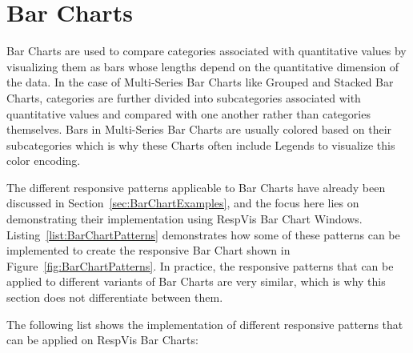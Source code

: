 \section{Bar Charts}
\label{sec:BarChartsUsage}

Bar Charts are used to compare categories associated with quantitative values by visualizing them as bars whose lengths depend on the quantitative dimension of the data.
In the case of Multi-Series Bar Charts like Grouped and Stacked Bar Charts, categories are further divided into subcategories associated with quantitative values and compared with one another rather than categories themselves.
Bars in Multi-Series Bar Charts are usually colored based on their subcategories which is why these Charts often include Legends to visualize this color encoding.

The different responsive patterns applicable to Bar Charts have already been discussed in Section~\ref{sec:BarChartExamples}, and the focus here lies on demonstrating their implementation using RespVis Bar Chart Windows.
Listing~\ref{list:BarChartPatterns} demonstrates how some of these patterns can be implemented to create the responsive Bar Chart shown in Figure~\ref{fig:BarChartPatterns}.
In practice, the responsive patterns that can be applied to different variants of Bar Charts are very similar, which is why this section does not differentiate between them.

The following list shows the implementation of different responsive patterns that can be applied on RespVis Bar Charts:

